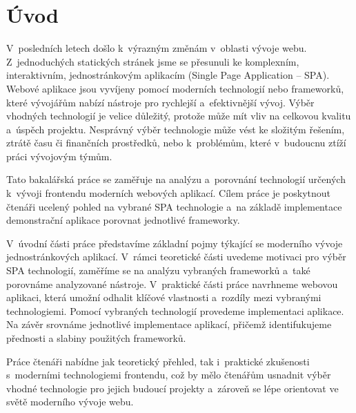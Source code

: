 \section*{Úvod}

V~posledních letech došlo k~výrazným změnám v~oblasti vývoje webu. 
Z~jednoduchých statických stránek jsme se přesunuli ke komplexním, interaktivním, jednostránkovým aplikacím (Single Page Application -- SPA). 
Webové aplikace jsou vyvíjeny pomocí moderních technologií nebo frameworků, které vývojářům nabízí nástroje pro rychlejší a~efektivnější vývoj. 
Výběr vhodných technologií je velice důležitý, protože může mít vliv na celkovou kvalitu a~úspěch projektu. 
Nesprávný výběr technologie může vést ke složitým řešením, ztrátě času či finančních prostředků, nebo k~problémům, které v~budoucnu ztíží práci vývojovým týmům.

Tato bakalářská práce se zaměřuje na analýzu a~porovnání technologií určených k~vývoji frontendu moderních webových aplikací. 
Cílem práce je poskytnout čtenáři ucelený pohled na vybrané SPA technologie a~na základě implementace demonstrační aplikace porovnat jednotlivé frameworky.

V~úvodní části práce představíme základní pojmy týkající se moderního vývoje jednostránkových aplikací. 
V~rámci teoretické části uvedeme motivaci pro výběr SPA technologií, zaměříme se na analýzu vybraných frameworků a~také porovnáme analyzované nástroje. 
V~praktické části práce navrhneme webovou aplikaci, která umožní odhalit klíčové vlastnosti a~rozdíly mezi vybranými technologiemi. 
Pomocí vybraných technologií provedeme implementaci aplikace. 
Na závěr srovnáme jednotlivé implementace aplikací, přičemž identifukujeme přednosti a slabiny použitých frameworků.

Práce čtenáři nabídne jak teoretický přehled, tak i~praktické zkušenosti s~moderními technologiemi frontendu, 
což by mělo čtenářům usnadnit výběr vhodné technologie pro jejich budoucí projekty a~zároveň se lépe orientovat ve světě moderního vývoje webu.


